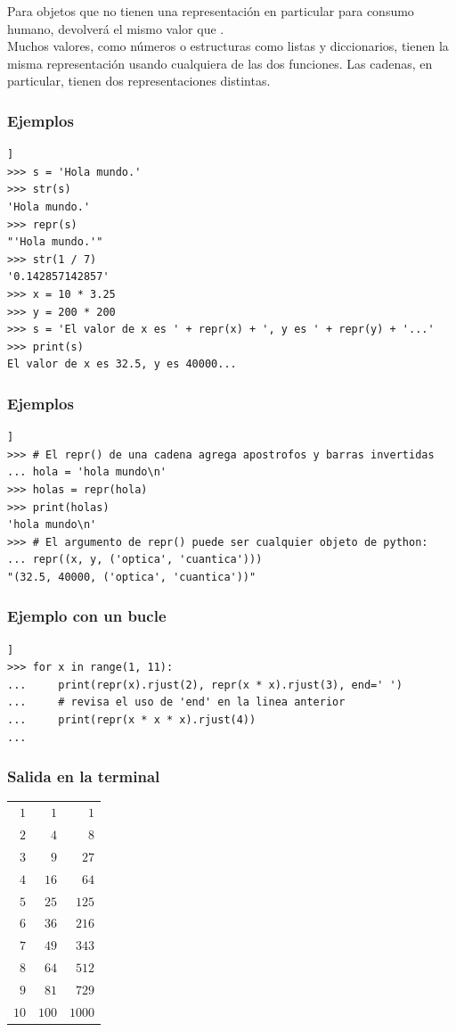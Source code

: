 \begin{frame}
Para objetos que no tienen una representación en particular para consumo humano,  devolverá el mismo valor que .
\\
\bigskip
Muchos valores, como números o estructuras como listas y diccionarios, tienen la misma representación usando cualquiera de las dos funciones. Las cadenas, en particular, tienen dos representaciones distintas.
\end{frame}
\begin{frame}
\frametitle{Ejemplos}
\begin{lstlisting}[numbers=none, basicstyle=\linespread{1.2}\ttfamily\small, columns=fullflexible]]
>>> s = 'Hola mundo.'
>>> str(s)
'Hola mundo.'
>>> repr(s)
"'Hola mundo.'"
>>> str(1 / 7)
'0.142857142857'
>>> x = 10 * 3.25
>>> y = 200 * 200
>>> s = 'El valor de x es ' + repr(x) + ', y es ' + repr(y) + '...'
>>> print(s)
El valor de x es 32.5, y es 40000...
\end{lstlisting}
\end{frame}
\begin{frame}[fragile]
\frametitle{Ejemplos}
\fontsize{12}{12}\selectfont
\begin{lstlisting}[numbers=none, basicstyle=\linespread{1.2}\ttfamily\small, columns=fullflexible]]
>>> # El repr() de una cadena agrega apostrofos y barras invertidas
... hola = 'hola mundo\n'
>>> holas = repr(hola)
>>> print(holas)
'hola mundo\n'
>>> # El argumento de repr() puede ser cualquier objeto de python:
... repr((x, y, ('optica', 'cuantica')))
"(32.5, 40000, ('optica', 'cuantica'))"
\end{lstlisting}
\end{frame}
\begin{frame}[fragile]
\frametitle{Ejemplo con un bucle}
\begin{lstlisting}[numbers=none, basicstyle=\linespread{1.2}\ttfamily\small, columns=fullflexible]]
>>> for x in range(1, 11):
...     print(repr(x).rjust(2), repr(x * x).rjust(3), end=' ')
...     # revisa el uso de 'end' en la linea anterior
...     print(repr(x * x * x).rjust(4))
...
\end{lstlisting}
\end{frame}
\begin{frame}
\frametitle{Salida en la terminal}
\fontsize{10}{10}\selectfont
\begin{table}
\begin{tabular}{ r r r}
$1$ & $1$ &  $1$ \\
$2$ & $4$ &  $8$ \\
$3$ & $9$ &  $27$ \\
$4$ & $16$ & $64$\\
$5$ & $25$ & $125$ \\
$6$ & $36$ & $216$ \\
$7$ & $49$ & $343$ \\
$8$ & $64$ & $512$ \\
$9$ & $81$ & $729$ \\
$10$ & $100$ & $1000$
\end{tabular}
\end{table}  
\end{frame}

